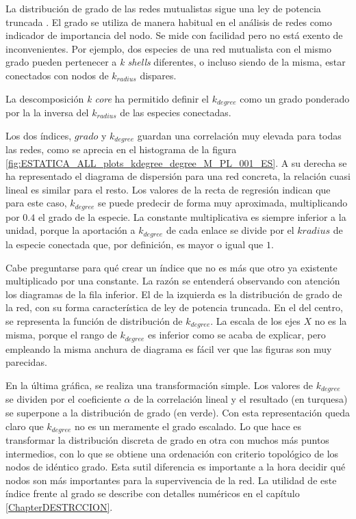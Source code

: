 La distribución de grado de las redes mutualistas sigue una ley de potencia truncada \cite{jordano2003invariant,vazquez2005degree}. El grado se utiliza de manera habitual en el análisis de redes como indicador de importancia del nodo. Se mide con facilidad pero no está exento de inconvenientes. Por ejemplo, dos especies de una red mutualista con el mismo grado pueden pertenecer a \textit{k shells} diferentes, o incluso siendo de la misma, estar conectados con nodos de $k_{radius}$ dispares.

La descomposición \textit{k core} ha permitido definir el $k_{degree}$ como un grado ponderado por la la inversa del $k_{radius}$ de las especies conectadas. 

Los dos índices, $grado$ y ${k}_{degree}$ guardan una correlación muy elevada para todas las redes, como se aprecia en el histograma de la figura \ref{fig:ESTATICA_ALL_plots_kdegree_degree_M_PL_001_ES}. A su derecha se ha representado el diagrama de dispersión para una red concreta, la relación cuasi lineal es similar para el resto. Los valores de la recta de regresión indican que para este caso, $k_{degree}$ se puede predecir de forma muy aproximada, multiplicando por $0.4$ el grado de la especie. La constante multiplicativa es siempre inferior a la unidad, porque la aportación a $k_{degree}$ de cada enlace se divide por el $k{radius}$ de la especie conectada que, por definición, es mayor o igual que $1$. 

Cabe preguntarse para qué crear un índice que no es más que otro ya existente multiplicado por una constante. La razón se entenderá observando con atención los diagramas de la fila inferior. El de la izquierda es la distribución de grado de la red, con su forma característica de ley de potencia truncada. En el del centro, se representa la función de distribución de $k_{degree}$. La escala de los ejes $X$ no es la misma, porque el rango de $k_{degree}$ es inferior como se acaba de explicar, pero empleando la misma anchura de diagrama es fácil ver que las figuras son muy parecidas.

En la última gráfica, se realiza una transformación simple. Los valores de $k_{degree}$ se dividen por el coeficiente $\alpha$ de la correlación lineal y el resultado (en turquesa) se superpone a la distribución de grado (en verde). Con esta representación queda claro que $k_{degree}$ no es un meramente el grado escalado. Lo que hace es transformar la distribución discreta de grado en otra con muchos más puntos intermedios, con lo que se obtiene una ordenación con criterio topológico de los nodos de idéntico grado. Esta sutil diferencia es importante a la hora decidir qué nodos son más importantes para la supervivencia de la red. La utilidad de este índice frente al grado se describe con detalles numéricos en el capítulo \ref{ChapterDESTRCCION}.

